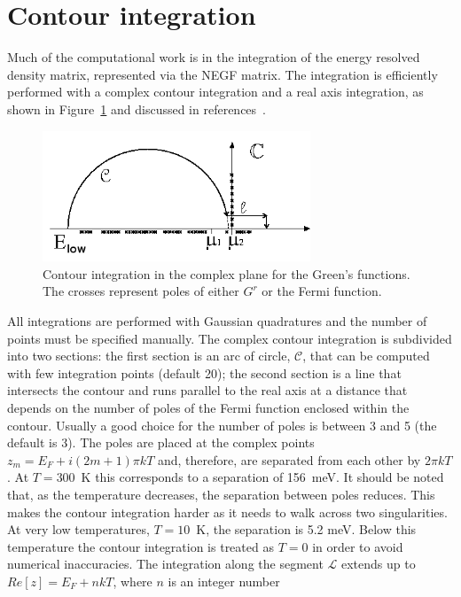 \section{Contour integration}

Much of the computational work is in the integration of the energy resolved
density matrix, represented via the NEGF matrix. The integration is efficiently
performed with a complex contour integration and a real axis integration, as
shown in Figure~\ref{fig:contour} and discussed in
references~\cite{Pecchia_spring, Pecchia_RPP, Pecchia_NJP}.
\begin{figure}[!h]
\begin{center}
\includegraphics[width=8.0cm]{Fig_integration.png}
\caption{ \label{fig:contour} Contour integration in the complex plane for the
  Green's functions. The crosses represent poles of either $G^r$ or the Fermi
  function.}
\end{center}
\end{figure}
All integrations are performed with Gaussian quadratures and the number of
points must be specified manually. The complex contour integration is subdivided
into two sections: the first section is an arc of circle, $\mathcal{C}$, that
can be computed with few integration points (default 20); the second section is
a line that intersects the contour and runs parallel to the real axis at a
distance that depends on the number of poles of the Fermi function enclosed
within the contour. Usually a good choice for the number of poles is between 3
and 5 (the default is 3). The poles are placed at the complex points $z_m = E_F
+ i (2m+1) \pi k T$ and, therefore, are separated from each other by $2 \pi k
T$.  At $T=300$~K this corresponds to a separation of 156~meV. It should be
noted that, as the temperature decreases, the separation between poles
reduces. This makes the contour integration harder as it needs to walk across
two singularities. At very low temperatures, $T=10$~K, the separation is 5.2
meV. Below this temperature the contour integration is treated as $T=0$ in order
to avoid numerical inaccuracies. The integration along the segment $\mathcal{L}$
extends up to $Re\left[ z \right]=E_F+nkT$, where $n$ is an integer number
